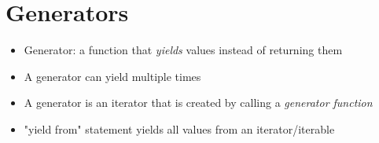 \section{Generators}
\begin{itemize}
    \item Generator: a function that \emph{yields} values instead of returning them
    \item A generator can yield multiple times
    \item A generator is an iterator that is created by calling a \emph{generator function}
    \item "yield from" statement yields all values from an iterator/iterable
\end{itemize}